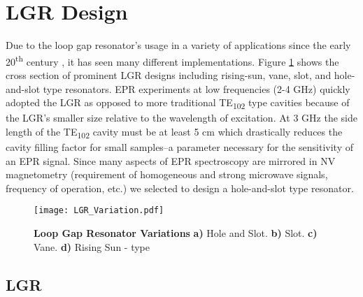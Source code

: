 

\section{LGR Design} \label{LGRDesignSection}

Due to the loop gap resonator's usage in a variety of applications since the early 20\textsuperscript{th} century \cite{collins1948microwave}, it has seen many different implementations. Figure \ref{LGR_variation} shows the cross section of prominent LGR designs including rising-sun, vane, slot, and hole-and-slot type resonators. EPR experiments at low frequencies (2-4 GHz) quickly adopted the LGR as opposed to more traditional TE\textsubscript{102} type cavities because of the LGR's smaller size relative to the wavelength of excitation. At 3 GHz the side length of the TE\textsubscript{102} cavity must be at least 5 cm which drastically reduces the cavity filling factor for small samples--a parameter necessary for the sensitivity of an EPR signal. Since many aspects of EPR spectroscopy are mirrored in NV magnetometry (requirement of homogeneous and strong microwave signals, frequency of operation, etc.) we selected to design a hole-and-slot type resonator. 
\vspace{5mm}
\begin{figure}[t!]
\centering
\texttt{[image: LGR\_Variation.pdf]}  
\caption{\textbf{Loop Gap Resonator Variations} \textbf{a)} Hole and Slot. \textbf{b)} Slot. \textbf{c)} Vane. \textbf{d)} Rising Sun - type}
\label{LGR_variation}
\end{figure}


\subsection{LGR}

